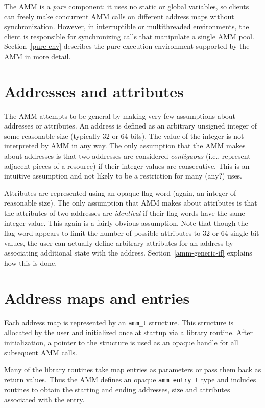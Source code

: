 The AMM is a \emph{pure} component:
it uses no static or global variables,
so clients can freely make concurrent AMM calls
on different address maps without synchronization.
However, in interruptible or multithreaded environments,
the client is responsible for synchronizing calls
that manipulate a single AMM pool.
Section~\ref{pure-env} describes the pure execution environment
supported by the AMM in more detail.

\section{Addresses and attributes}

The AMM attempts to be general by making very few assumptions about
addresses or attributes.
An address is defined as an arbitrary unsigned integer of some reasonable size
(typically 32 or 64 bits).
The value of the integer is not interpreted by AMM in any way.
The only assumption that the AMM makes about addresses is that
two addresses are considered \emph{contiguous}
(i.e., represent adjacent pieces of a resource)
if their integer values are consecutive.
This is an intuitive assumption and not likely to be a restriction for
many (any?) uses.

Attributes are represented using an opaque flag word (again, an integer
of reasonable size).
The only assumption that AMM makes about attributes is that the attributes
of two addresses are \emph{identical} if their flag words have the same
integer value.
This again is a fairly obvious assumption.
Note that though the flag word appears to limit the number of possible
attributes to 32 or 64 single-bit values,
the user can actually define arbitrary attributes for an address by
associating additional state with the address.
Section~\ref{amm-generic-if} explains how this is done.

\section{Address maps and entries}

Each address map is represented by an {\tt amm_t} structure.
This structure is allocated by the user and initialized once at startup
via a library routine.
After initialization, a pointer to the structure is used as an opaque handle
for all subsequent AMM calls.

Many of the library routines take map entries as parameters or pass them
back as return values.
Thus the AMM defines an opaque {\tt amm_entry_t} type and includes routines
to obtain the starting and ending addresses, size and attributes associated
with the entry.

